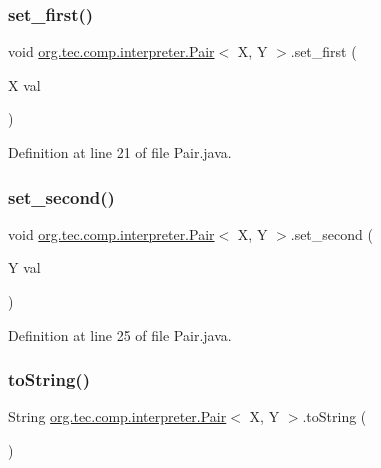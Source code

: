 \subsubsection{\texorpdfstring{set\+\_\+first()}{set\_first()}}
{\footnotesize\ttfamily void \mbox{\hyperlink{classorg_1_1tec_1_1comp_1_1interpreter_1_1_pair}{org.\+tec.\+comp.\+interpreter.\+Pair}}$<$ X, Y $>$.set\+\_\+first (\begin{DoxyParamCaption}\item[{X}]{val }\end{DoxyParamCaption})\hspace{0.3cm}{\ttfamily [inline]}}



Definition at line 21 of file Pair.\+java.

\mbox{\label{classorg_1_1tec_1_1comp_1_1interpreter_1_1_pair_a330ca66245c6b75ca8661ace26ee841b}} 
\subsubsection{\texorpdfstring{set\+\_\+second()}{set\_second()}}
{\footnotesize\ttfamily void \mbox{\hyperlink{classorg_1_1tec_1_1comp_1_1interpreter_1_1_pair}{org.\+tec.\+comp.\+interpreter.\+Pair}}$<$ X, Y $>$.set\+\_\+second (\begin{DoxyParamCaption}\item[{Y}]{val }\end{DoxyParamCaption})\hspace{0.3cm}{\ttfamily [inline]}}



Definition at line 25 of file Pair.\+java.

\mbox{\label{classorg_1_1tec_1_1comp_1_1interpreter_1_1_pair_a41919bd5825de0285bd02a3579bf17da}} 
\subsubsection{\texorpdfstring{to\+String()}{toString()}}
{\footnotesize\ttfamily String \mbox{\hyperlink{classorg_1_1tec_1_1comp_1_1interpreter_1_1_pair}{org.\+tec.\+comp.\+interpreter.\+Pair}}$<$ X, Y $>$.to\+String (\begin{DoxyParamCaption}{ }\end{DoxyParamCaption})\hspace{0.3cm}{\ttfamily [inline]}}



